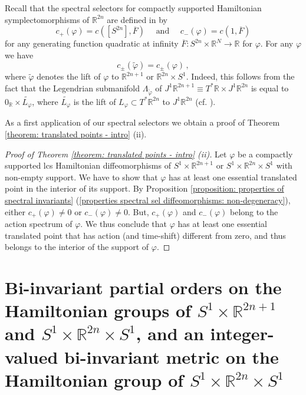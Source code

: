 \documentclass{amsart}
\theoremstyle{remark}
\begin{document}
Recall that the spectral selectors
for compactly supported Hamiltonian symplectomorphisms of $\mathbb{R}^{2n}$
are defined in \cite{Viterbo} by
\[
c_+ (\varphi) = c ([S^{2n}], \overline{F})
\quad \text{ and } \quad
c_- (\varphi) = c (1, \overline{F})
\]
for any generating function quadratic at infinity
$\overline{F}: S^{2n} \times \mathbb{R}^N \rightarrow \mathbb{R}$
for $\varphi$.
For any $\varphi$ we have
\[
c_{\pm} (\widetilde{\varphi}) = c_{\pm} (\varphi) \,,
\]
where $\widetilde{\varphi}$ denotes the lift of $\varphi$
to $\mathbb{R}^{2n+1}$ or $\mathbb{R}^{2n} \times S^1$.
Indeed, this follows from the fact that
the Legendrian submanifold $\Lambda_{\widetilde{\varphi}}$
of $J^1\mathbb{R}^{2n+1} \equiv T^{\ast}\mathbb{R} \times J^1\mathbb{R}^{2n}$
is equal to $0_{\mathbb{R}} \times \widetilde{L_{\varphi}}$,
where $\widetilde{L_{\varphi}}$ is the lift
of $L_{\varphi} \subset T^{\ast}\mathbb{R}^{2n}$
to $J^1\mathbb{R}^{2n}$
(cf. \cite[Proposition 3.18]{San11}).

As a first application of our spectral selectors
we obtain a proof of Theorem \ref{theorem: translated points - intro} (ii).

\begin{proof}[Proof of Theorem \ref{theorem: translated points - intro} (ii)]
Let $\varphi$ be a compactly supported lcs Hamiltonian diffeomorphisms
of $S^1 \times \mathbb{R}^{2n+1}$ or $S^1 \times \mathbb{R}^{2n} \times S^1$
with non-empty support.
We have to show that $\varphi$
has at least one essential translated point
in the interior of its support.
By Proposition \ref{proposition: properties of spectral invariants}
(\ref{properties spectral sel diffeomorphisms: non-degeneracy}),
either $c_+ (\varphi) \neq 0$ or $c_- (\varphi) \neq 0$.
But,
$c_+ (\varphi)$ and $c_- (\varphi)$
belong to the action spectrum of $\varphi$.
We thus conclude that $\varphi$ has at least one essential translated point
that has action (and time-shift) different from zero,
and thus belongs to the interior of the support of $\varphi$.
\end{proof}


\section{Bi-invariant partial orders on the Hamiltonian groups
of $S^1 \times \mathbb{R}^{2n+1}$ and $S^1 \times \mathbb{R}^{2n} \times S^1$,
and an integer-valued bi-invariant metric on the Hamiltonian group
of $S^1 \times \mathbb{R}^{2n} \times S^1$}
\label{section: order and metric}
\end{document}
